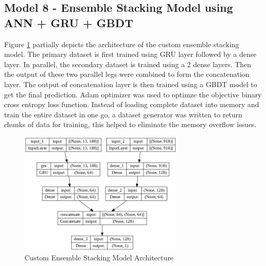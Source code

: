 \documentclass[twoside,11pt,a4paper]{article}
\begin{document}
\subsection{Model 8 - Ensemble Stacking Model using \acs{ANN} + \acs{GRU} + \acs{GBDT}}
Figure \ref{fig:gru_nn_gbdt_arch} partially depicts the architecture of the custom ensemble stacking model. The primary dataset is first trained using \acs{GRU} layer followed by a dense layer. In parallel, the secondary dataset is trained using a 2 dense layers. Then the output of these two parallel legs were combined to form the concatenation layer. The output of concatenation layer is then trained using a  \acs{GBDT} model to get the final prediction. Adam optimizer was used to optimze the objective binary cross entropy loss function. Instead of loading complete dataset into memory and train the entire dataset in one go, a dataset generator was written to return chunks of data for training, this helped to eliminate the memory overflow issues.\\
\begin{figure}[ht]
	\centering
	\includegraphics[width=0.7\textwidth, height=0.3\textheight]{GRU_NN_GBDT_Architecture}
	\caption[Custom Ensemble Stacking Model Architecture]{Custom Ensemble Stacking Model Architecture}
	\label{fig:gru_nn_gbdt_arch}
\end{figure}
\end{document}
